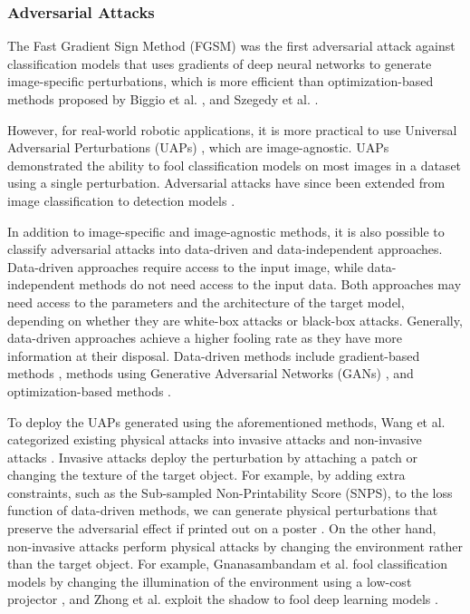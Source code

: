 \subsubsection{Adversarial Attacks}

 The Fast Gradient Sign Method (FGSM) \citep{GoodfellowSS14} was the first adversarial attack against classification models that uses gradients of deep neural networks to generate image-specific perturbations, which is more efficient than optimization-based methods proposed by Biggio et al. \citep{biggio2013evasion}, and Szegedy et al. \citep{szegedy2013intriguing}. 

However, for real-world robotic applications, it is more practical to use Universal Adversarial Perturbations (UAPs) \citep{moosavi2017universal, li2021universal, wu2023adversariald}, which are image-agnostic. UAPs demonstrated the ability to fool classification models on most images in a dataset using a single perturbation. Adversarial attacks have since been extended from image classification to detection models \citep{gurbaxani2018traits, han2023detection}.

In addition to image-specific and image-agnostic methods, it is also possible to classify adversarial attacks into data-driven and data-independent approaches.  Data-driven approaches require access to the input image, while data-independent methods do not need access to the input data. Both approaches may need access to the parameters and the architecture of the target model, depending on whether they are white-box attacks or black-box attacks.  Generally, data-driven approaches achieve a higher fooling rate as they have more information at their disposal. Data-driven methods include gradient-based methods \citep{chow2020adversarial,li2021universal, xie2017adversarial, wu2023adversarial}, methods using Generative Adversarial Networks (GANs) \citep{hashemi2020transferable,Wei2019}, and optimization-based methods \citep{carlini2017towards,liao2021transferable}. 

To deploy the UAPs generated using the aforementioned methods, Wang et al. categorized existing physical attacks into invasive attacks and
non-invasive attacks \citep{wang2022survey}. Invasive attacks deploy the perturbation by attaching a patch \citep{lee2019physical, xu2020adversarial, hu2021naturalistic, thys2019fooling} or changing the texture \citep{wang2021dual, wang2022fca} of the target object. For example, by adding extra constraints, such as the Sub-sampled Non-Printability Score (SNPS), to the loss function of data-driven methods, we can generate physical perturbations that preserve the adversarial effect if printed out on a poster \citep{lee2019physical}. On the other hand, non-invasive attacks perform physical attacks by changing the environment rather than the target object. For example, Gnanasambandam et al. fool classification models by changing the illumination of the environment using a low-cost projector \citep{gnanasambandam2021optical}, and Zhong et al. exploit the shadow to fool deep learning models \citep{zhong2022shadows}.

